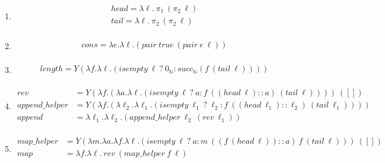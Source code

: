 \documentclass{article}
\begin{document}
\begin{enumerate}
\begin{enumerate}
        \item %
        \begin{equation}
            \begin{aligned}
                head = \lambda \ell.\ \pi_1\ (\pi_2\ \ell) \\
                tail = \lambda \ell.\ \pi_2\ (\pi_2\ \ell) \\
            \end{aligned}
        \end{equation}

        \item %
        \begin{equation}
            \begin{aligned}
                cons = \lambda e. \lambda \ell.(pair\ true\ (pair\ e\ \ell)) \\
            \end{aligned}
        \end{equation}

        \item %
        \begin{equation}
            \begin{aligned}
                length = Y(\lambda f. \lambda \ell.(isempty\ \ell\ ?\ 0_\mathbb{N} : succ_\mathbb{N} (f\ (tail\ \ell)))) \\
            \end{aligned}
        \end{equation}

        \item %
        \begin{equation}
            \begin{aligned}
                rev &= Y(\lambda f.(\lambda a. \lambda \ell.(isempty\ \ell\ ?\ a : f\ ((head\ \ell) :: a)\ (tail\ \ell))))\ ([]) \\
                append\_helper &= Y(\lambda f.(\lambda \ell_2. \lambda \ell_1.(isempty\ \ell_1\ ?\ \ell_2 : f\ ((head\ \ell_1) :: \ell_2)\ (tail\ \ell_1)))) \\
                append &= \lambda \ell_1. \lambda \ell_2. (append\_helper\ \ell_2\ (rev\ \ell_1)) \\
            \end{aligned}
        \end{equation}

        \item %
        \begin{equation}
            \begin{aligned}
                map\_helper &= Y(\lambda m. \lambda a. \lambda f. \lambda \ell.(isempty\ \ell\ ?\ a : m\ ((f\ (head\ \ell)) :: a)\ f\ (tail\ \ell)))\ ([]) \\
                map &= \lambda f. \lambda \ell.\ rev\ ( map\_helper\ f\ \ell ) \\
            \end{aligned}
        \end{equation}


\end{enumerate}
\end{enumerate}
\end{document}
